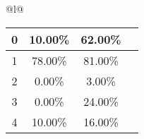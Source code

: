 \begin{longtable}{@{}l@{}}
\begin{minipage}{\textwidth}
\begin{tabular}{|c|c|c|c|}
0 & 10.00\% & 62.00\% & \textcolor{green}{\ding{51}} \\ \hline
1 & 78.00\% & 81.00\% & \textcolor{green}{\ding{51}} \\ \hline
2 & 0.00\% & 3.00\% & \textcolor{green}{\ding{51}} \\ \hline
3 & 0.00\% & 24.00\% & \textcolor{green}{\ding{51}} \\ \hline
4 & 10.00\% & 16.00\% & \textcolor{green}{\ding{51}} \\ \hline
\end{tabular}
\end{minipage}\\[2ex]
\end{longtable}